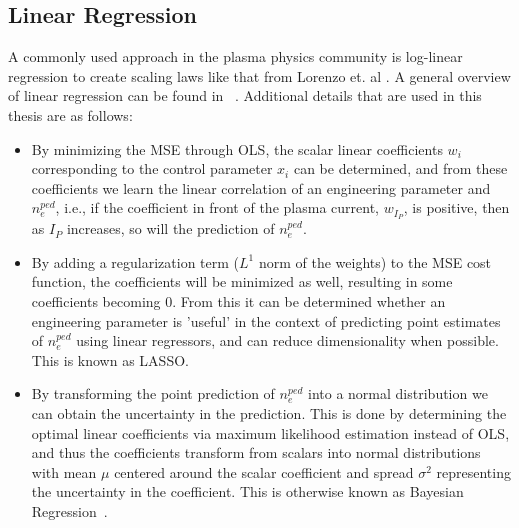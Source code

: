 \documentclass[a4paper, twoside, final, 12pt]{article}
\begin{document}
\subsection{Linear Regression}
A commonly used approach in the plasma physics community is log-linear regression to create scaling laws like that from Lorenzo et. al \cite{Frassinetti_2020}.
A general overview of linear regression can be found in ~\cite{hastie01statisticallearning}. 
Additional details that are used in this thesis are as follows: 
\begin{itemize}
	\item By minimizing the MSE through OLS, the scalar linear coefficients $w_i$ corresponding to the control parameter $x_i$ can be determined, and from these coefficients we learn the linear correlation of an engineering parameter and $n_e^{ped}$, i.e., if the coefficient in front of the plasma current, $w_{I_P}$, is positive, then as $I_P$ increases, so will the prediction of $n_e^{ped}$.
	\item By adding a regularization term ($L^1$ norm of the weights) to the MSE cost function, the coefficients will be minimized as well, resulting in some coefficients becoming 0. From this it can be determined whether an engineering parameter is 'useful' in the context of predicting point estimates of $n_e^{ped}$ using linear regressors, and can reduce dimensionality when possible. This is known as LASSO. \cite{Bisong2019, LASSO_OG, LASSO_COIN}
	\item By transforming the point prediction of $n_e^{ped}$  into a normal distribution we can obtain the uncertainty in the prediction. This is done by determining the optimal linear coefficients via maximum likelihood estimation instead of OLS, and thus the coefficients transform from scalars into normal distributions with mean $\mu$ centered around the scalar coefficient and spread $\sigma^2$ representing the uncertainty in the coefficient. This is otherwise known as Bayesian Regression~\cite{bayes_regr}.
\end{itemize}
\end{document}
